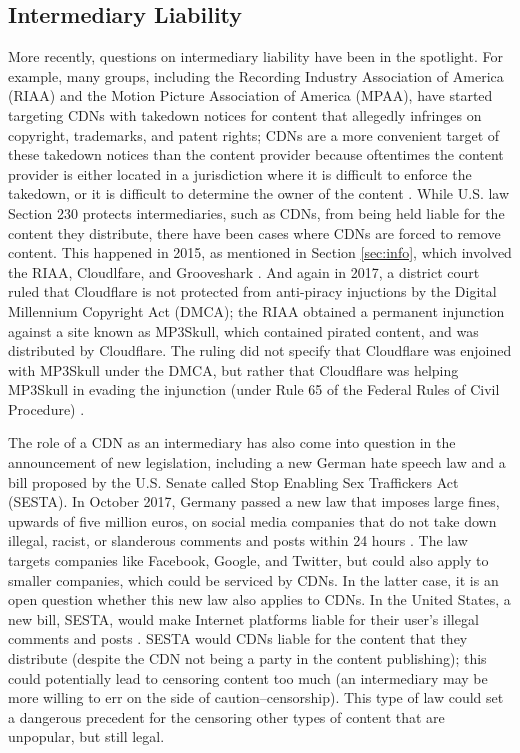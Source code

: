 \subsection{Intermediary Liability}
More recently, questions on intermediary liability have been in the spotlight.  For example, many groups, including the Recording Industry 
Association of America (RIAA) and the Motion Picture Association of America (MPAA), have started targeting CDNs with takedown notices for 
content that allegedly infringes on copyright, trademarks, and patent rights; CDNs are a more convenient target of these takedown notices than 
the content provider because oftentimes the content provider is either located in a jurisdiction where it is difficult to enforce the takedown, 
or it is difficult to determine the owner of the content \cite{medium_copyright,eff_copyright}.  While U.S. law Section 230 protects intermediaries, such as CDNs, from being held 
liable for the content they distribute, there have been cases where CDNs are forced to remove content.  This happened in 2015, as mentioned in Section \ref{sec:info}, which 
involved the RIAA, Cloudlfare, and Grooveshark \cite{techdirt_copyright}.  
And again in 2017, a district court ruled that Cloudflare is not protected from anti-piracy injuctions by the Digital Millennium Copyright Act (DMCA); the 
RIAA obtained a permanent injunction against a site known as MP3Skull, which contained pirated content, and was distributed by Cloudflare.  The ruling 
did not specify that Cloudflare was enjoined with MP3Skull under the DMCA, but rather that Cloudflare was helping MP3Skull in evading the injunction (under 
Rule 65 of the Federal Rules of Civil Procedure) \cite{stack_copyright}.

The role of a CDN as an intermediary has also come into question in the announcement of new legislation, including a new German hate speech law and 
a bill proposed by the U.S. Senate called Stop Enabling Sex Traffickers Act (SESTA).  In October 2017, Germany passed a new law that imposes large fines, upwards of five million euros,
on social media companies that do not take down illegal, racist, or slanderous comments and posts within 24 hours \cite{nytimes_hatespeech}.  The law 
targets companies like Facebook, Google, and Twitter, but could also apply to smaller companies, which could be serviced by CDNs.  In the latter case, it is 
an open question whether this new law also applies to CDNs.  In the United States, a new bill, SESTA, would make Internet platforms liable for their user's illegal comments 
and posts \cite{medium_sesta}.  SESTA would CDNs liable for the content that they distribute (despite the CDN not being a party in the content publishing); this could potentially lead to 
censoring content too much (an intermediary may be more willing to err on the side of caution--censorship).  This type of law could set a dangerous precedent 
for the censoring other types of content that are unpopular, but still legal. 
